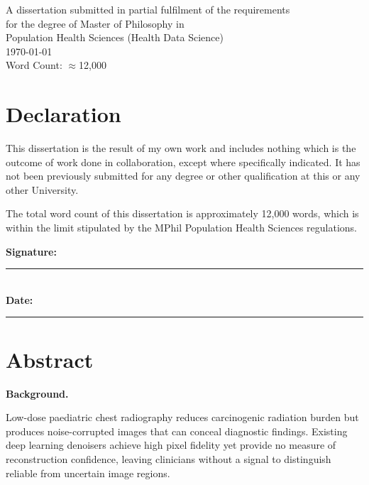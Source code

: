 \documentclass[12pt, a4paper, twoside, openright]{book}
\begin{document}
\begin{titlepage}
  {\large A dissertation submitted in partial fulfilment of the requirements\\
  for the degree of Master of Philosophy in\\
  Population Health Sciences (Health Data Science)}\\[0.8cm]

  {\large \today}\\[0.5cm]
  {\large Word Count: $\approx$12{,}000}

  \vfill
\end{titlepage}

\chapter*{Declaration}

This dissertation is the result of my own work and includes nothing which is the outcome of work done in collaboration, except where specifically indicated. It has not been previously submitted for any degree or other qualification at this or any other University.

The total word count of this dissertation is approximately 12{,}000 words, which is within the limit stipulated by the MPhil Population Health Sciences regulations.

\vspace{2cm}
\noindent\textbf{Signature:} \rule{6cm}{0.4pt}\\[0.5em]
\textbf{Date:} \rule{6cm}{0.4pt}

\newpage

\chapter*{Abstract}

\textbf{Background.}

\linenumber
Low-dose paediatric chest radiography reduces carcinogenic radiation burden but produces noise-corrupted images that can conceal diagnostic findings. Existing deep learning denoisers achieve high pixel fidelity yet provide no measure of reconstruction confidence, leaving clinicians without a signal to distinguish reliable from uncertain image regions.
\end{document}
